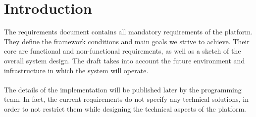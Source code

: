 \chapter{Introduction}
The requirements document contains all mandatory requirements of the platform. They define the framework conditions and main goals we strive to achieve. Their core are functional and non-functional requirements, as well as a sketch of the overall system design. The draft takes into account the future environment and infrastructure in which the system will operate. 
\\\\
The details of the implementation will be published later by the programming team. In fact, the current requirements do not specify any technical solutions, in order to not restrict them while designing the technical aspects of the platform.
